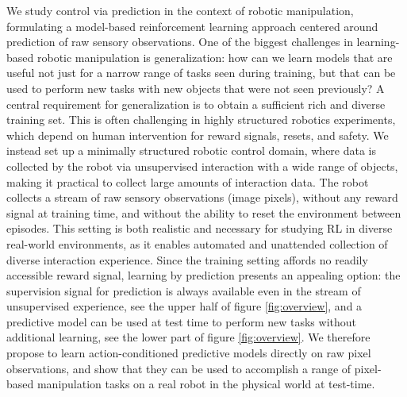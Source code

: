 We study control via prediction in the context of robotic manipulation, formulating a model-based reinforcement learning approach centered around prediction of raw sensory observations. One of the biggest challenges in learning-based robotic manipulation is generalization: how can we learn models that are useful not just for a narrow range of tasks seen during training, but that can be used to perform new tasks with new objects that were not seen previously?
A central requirement for generalization is to obtain a sufficient rich and diverse training set. This is often challenging in highly structured robotics experiments, which depend on human intervention for reward signals, resets, and safety. We instead set up a minimally structured robotic control domain, where data is collected by the robot via unsupervised interaction with a wide range of objects, making it practical to collect large amounts of interaction data. The robot collects a stream of raw sensory observations (image pixels), without any reward signal at training time, and without the ability to reset the environment between episodes. This setting is both realistic and necessary for studying RL in diverse real-world environments, as it enables automated and unattended collection of diverse interaction experience. Since the training setting affords no readily accessible reward signal, learning by prediction presents an appealing option: the supervision signal for prediction is always available even in the stream of unsupervised experience, see the upper half of figure \ref{fig:overview}, and a predictive model can be used at test time to perform new tasks without additional learning, see the lower part of figure \ref{fig:overview}.
We therefore propose to learn action-conditioned predictive models directly on raw pixel observations, and show that they can be used to accomplish a range of pixel-based manipulation tasks on a real robot in the physical world at test-time.

